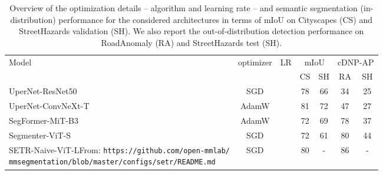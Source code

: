 \documentclass[10pt,twocolumn,letterpaper]{article}
\begin{document}
\begin{table}[]
    \centering
    \scriptsize
    \begin{tabular}{l|c|c|c|c|c|c}
    \toprule
    Model & optimizer & LR & \multicolumn{2}{c|}{mIoU} & \multicolumn{2}{c}{cDNP-AP} \\
    & & & CS & SH & RA & SH \\
        \midrule
        UperNet-ResNet50      & SGD   &  & 78 & 66 & 34 & 25\\
        UperNet-ConvNeXt-T    & AdamW &  & 81 & 72 & 47 & 27\\
        SegFormer-MiT-B3      & AdamW &  & 72 & 69 & 78 & 37\\
        Segmenter-ViT-S       & SGD   &  & 72 & 61 & 80 & 44\\
        SETR-Naive-ViT-L\tablefootnote{From: \texttt{https://github.com/open-mmlab/}\\\texttt{mmsegmentation/blob/master/configs/setr/README.md}}      & SGD   &  & 80 & - & 86 & -\\
        \bottomrule
    \end{tabular}
    \caption{Overview of the optimization details -- algorithm and learning rate -- and semantic segmentation (in-distribution) performance for the considered architectures in terms of mIoU on Cityscapes (CS) and StreetHazards validation (SH). We also report the out-of-distribution detection performance on RoadAnomaly (RA) and StreetHazards test (SH).}
    \label{tab:optim}
\end{table} 
\end{document}
